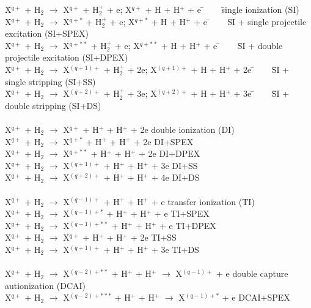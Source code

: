 \documentclass[draft]{agujournal2018}
\begin{document}
\begin{tabbing}
\= X$^{q+}$ + H$_2$ $\rightarrow$ X$^{q+}$ + H$_2^+$ + e;  X$^{q+}$ + H + H$^+$ + e \= $\;\;\;\;\;$ \= single ionization (SI) \\
\= X$^{q+}$ + H$_2$ $\rightarrow$ X$^{q+*}$ + H$_2^+$ + e;  X$^{q+*}$ + H + H$^+$ + e \= $\;\;\;\;\;$ \= SI + single projectile excitation (SI+SPEX) \\
\= X$^{q+}$ + H$_2$ $\rightarrow$ X$^{q+**}$ + H$_2^+$ + e;  X$^{q+**}$ + H + H$^+$ + e \= $\;\;\;\;\;$ \= SI + double projectile excitation (SI+DPEX) \\
\= X$^{q+}$ + H$_2$ $\rightarrow$ X$^{(q+1)+}$ + H$_2^+$ + 2e;  X$^{(q+1)+}$ + H + H$^+$ + 2e \= $\;\;\;\;\;$ \= SI + single stripping (SI+SS)\\
\= X$^{q+}$ + H$_2$ $\rightarrow$ X$^{(q+2)+}$ + H$_2^+$ + 3e;  X$^{(q+2)+}$ + H + H$^+$ + 3e \= $\;\;\;\;\;$ \= SI + double stripping (SI+DS) \\
\\
\> X$^{q+}$ + H$_2$ $\rightarrow$ X$^{q+}$ + H$^+$ + H$^+$ + 2e	 \>  \> double ionization (DI) \\
\> X$^{q+}$ + H$_2$ $\rightarrow$ X$^{q+*}$ + H$^+$ + H$^+$ + 2e \>  \> DI+SPEX \\
\> X$^{q+}$ + H$_2$ $\rightarrow$ X$^{q+**}$ + H$^+$ + H$^+$ + 2e \>  \> DI+DPEX \\
\> X$^{q+}$ + H$_2$ $\rightarrow$ X$^{(q+1)+}$ + H$^+$ + H$^+$ + 3e \>  \> DI+SS \\
\> X$^{q+}$ + H$_2$ $\rightarrow$ X$^{(q+2)+}$ + H$^+$ + H$^+$ + 4e	 \>  \> DI+DS \\
\\
\> X$^{q+}$ + H$_2$ $\rightarrow$ X$^{(q-1)+}$ + H$^+$ + H$^+$ + e  \>  \> transfer ionization (TI) \\
\> X$^{q+}$ + H$_2$ $\rightarrow$ X$^{(q-1)+*}$ + H$^+$ + H$^+$ + e  \>  \> TI+SPEX \\
\> X$^{q+}$ + H$_2$ $\rightarrow$ X$^{(q-1)+**}$ + H$^+$ + H$^+$ + e  \>  \> TI+DPEX \\
\> X$^{q+}$ + H$_2$ $\rightarrow$ X$^{q+}$ + H$^+$ + H$^+$ + 2e  \>  \> TI+SS \\
\> X$^{q+}$ + H$_2$ $\rightarrow$ X$^{(q+1)+}$ + H$^+$ + H$^+$ + 3e  \>  \> TI+DS \\
\\
\> X$^{q+}$ + H$_2$ $\rightarrow$ X$^{(q-2)+**}$ + H$^+$ + H$^+$ $\rightarrow$ X$^{(q-1)+}$ + e  \>  \> double capture autionization (DCAI) \\
\> X$^{q+}$ + H$_2$ $\rightarrow$ X$^{(q-2)+***}$ + H$^+$ + H$^+$ $\rightarrow$ X$^{(q-1)+*}$ + e  \>  \> DCAI+SPEX \\

\end{tabbing}
\end{document}
